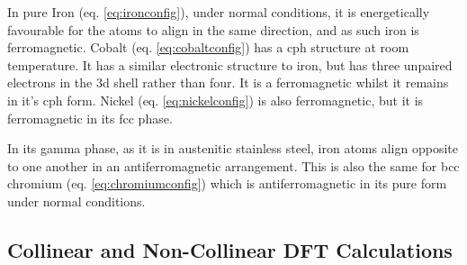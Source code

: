 In pure Iron (eq. \ref{eq:ironconfig}), under normal conditions, it is energetically favourable for the atoms to align in the same direction, and as such iron is ferromagnetic.  Cobalt (eq. \ref{eq:cobaltconfig}) has a \acrlong{cph} structure at room temperature.  It has a similar electronic structure to iron, but has three unpaired electrons in the 3d shell rather than four.  It is a ferromagnetic whilst it remains in it's \acrshort{cph} form.  Nickel (eq. \ref{eq:nickelconfig}) is also ferromagnetic, but it is ferromagnetic in its \acrshort{fcc} phase.

In its gamma phase, as it is in austenitic stainless steel, iron atoms align opposite to one another in an antiferromagnetic arrangement.  This is also the same for \acrshort{bcc} chromium (eq. \ref{eq:chromiumconfig})  which is antiferromagnetic in its pure form under normal conditions.

 





\subsection{Collinear and Non-Collinear DFT Calculations}







